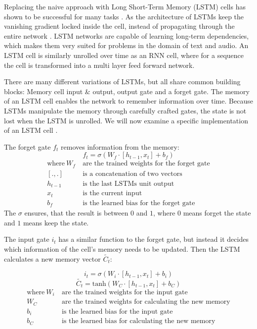 \documentclass[draft,final,oneside]{vutinfth} %
\begin{document}
Replacing the naive approach with Long Short-Term Memory (LSTM) cells has shown to be successful for many tasks \cite{nmt}\cite{hochreiter}\cite{deeplearninginneuralnetworks}. As the architecture of LSTMs keep the vanishing gradient locked inside the cell, instead of propagating through the entire network \cite{hochreiter}. LSTM networks are capable of learning long-term dependencies, which makes them very suited for problems in the domain of text and audio. An LSTM cell is similarly unrolled over time as an RNN cell, where for a sequence the cell is transformed into a multi layer feed forward network. 

There are many different variations of LSTMs, but all share common building blocks: Memory cell input \& output, output gate and a forget gate. The memory of an LSTM cell enables the network to remember information over time. Because LSTMs manipulate the memory through carefully crafted gates, the state is not lost when the LSTM is unrolled. We will now examine a specific implementation of an LSTM cell \cite{TODO}.

The forget gate $f_t$ removes information from the memory:
\begin{equation}
f_t = \sigma \left(W_f \cdot \left[ h_{t-1}, x_t \right] + b_f\right)
\end{equation}
\begin{align*}
\text{where}~W_f&~\text{are the trained weights for the forget gate} \\
\left[. , . \right]&~\text{is a concatenation of two vectors} \\
h_{t-1}&~\text{is the last LSTMs unit output} \\
x_t&~\text{is the current input} \\
b_f&~\text{is the learned bias for the forget gate}
\end{align*}
The $\sigma$ ensures, that the result is between $0$ and $1$, where $0$ means forget the state and $1$ means keep the state.

The input gate $i_t$ has a similar function to the forget gate, but instead it decides which information of the cell's memory needs to be updated. Then the LSTM calculates a new memory vector $\widetilde{C_t}$:  

\begin{equation}
i_t=\sigma\left(W_i \cdot \left[ h_{t-1}, x_t\right] + b_i \right)
\end{equation}
\begin{equation}
\widetilde{C_t} = \text{tanh}\left( W_C \cdot \left[ h_{t-1}, x_t \right] + b_C \right)
\end{equation}
\begin{align*}
\text{where}~W_i&~\text{are the trained weights for the input gate} \\
W_C&~\text{are the trained weights for calculating the new memory} \\
b_i&~\text{is the learned bias for the input gate} \\
b_C&~\text{is the learned bias for calculating the new memory} \\
\end{align*}
\end{document}
